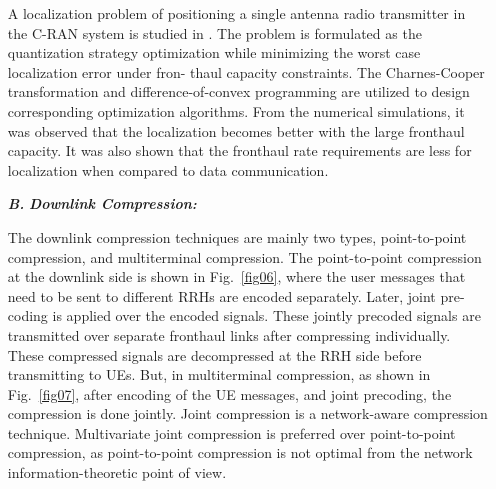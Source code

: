 \begin{multicols}{2}
\begin{itemize}
A localization problem of positioning a single antenna radio transmitter in the C-RAN system is studied in \cite{art3-key58}. The problem is formulated as the quantization strategy optimization while minimizing the worst case localization error under fron- thaul capacity constraints. The Charnes-Cooper transformation and difference-of-convex programming are utilized to design corresponding optimization algorithms. From the numerical simulations, it was observed that the localization becomes better with the large fronthaul capacity. It was also shown that the fronthaul rate requirements are less for localization when compared to data communication.

\item[{\textit{\textbf{ B.}}}] {\textit{\textbf{Downlink Compression:}}}

The downlink compression techniques are mainly two types, point-to-point compression, and multiterminal compression. The point-to-point compression at the downlink side is shown in Fig.~\ref{fig06}, where the user messages that need to be sent to different RRHs are encoded separately. Later, joint pre-coding is applied over the encoded signals. These jointly precoded signals are transmitted over separate fronthaul links after compressing individually. These compressed signals are decompressed at the RRH side before transmitting to UEs. But, in multiterminal compression, as shown in Fig.~\ref{fig07}, after encoding of the UE messages, and joint precoding, the compression is done jointly. Joint compression is a network-aware compression technique. Multivariate joint compression is preferred over point-to-point compression, as point-to-point compression is not optimal from the network information-theoretic point of view.


\end{itemize}
\end{multicols}
